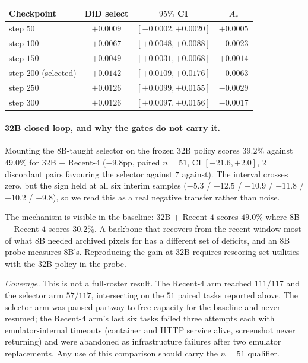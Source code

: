 \documentclass[letterpaper]{article} %
\begin{document}
\begin{center}
\centering
{\small
\setlength{\tabcolsep}{4.2pt}
\begin{tabular}{@{}lccc@{}}
\toprule
Checkpoint & DiD select & $95\%$ CI & $A_r$ \\
\midrule
step $50$ & $+0.0009$ & $[-0.0002,+0.0020]$ & $+0.0005$ \\
step $100$ & $+0.0067$ & $[+0.0048,+0.0088]$ & $-0.0023$ \\
step $150$ & $+0.0049$ & $[+0.0031,+0.0068]$ & $+0.0014$ \\
step $200$ (selected) & $\mathbf{+0.0142}$ & $[+0.0109,+0.0176]$ & $-0.0063$ \\
step $250$ & $+0.0126$ & $[+0.0099,+0.0155]$ & $-0.0029$ \\
step $300$ & $+0.0126$ & $[+0.0097,+0.0156]$ & $-0.0017$ \\
\bottomrule
\end{tabular}
}
\label{tab:s-32b-gates}
\end{center}

\paragraph{32B closed loop, and why the gates do not carry it.}
Mounting the 8B-taught selector on the frozen 32B policy scores $39.2\%$
against $49.0\%$ for 32B $+$ Recent-$4$ ($-9.8$pp, paired $n{=}51$, CI
$[-21.6,+2.0]$, $2$ discordant pairs favouring the selector against
$7$ against). The interval crosses zero, but the sign held at all six
interim samples ($-5.3$ / $-12.5$ / $-10.9$ / $-11.8$ / $-10.2$ /
$-9.8$), so we read this as a real negative transfer rather than noise.

The mechanism is visible in the baseline: 32B $+$ Recent-$4$ scores
$49.0\%$ where 8B $+$ Recent-$4$ scores $30.2\%$. A backbone that
recovers from the recent window most of what 8B needed archived pixels
for has a different set of deficits, and an 8B probe measures 8B's.
Reproducing the gain at 32B requires rescoring set utilities with the
32B policy in the probe.

\emph{Coverage.} This is not a full-roster result. The Recent-$4$ arm
reached $111/117$ and the selector arm $57/117$, intersecting on the
$51$ paired tasks reported above. The selector arm was paused partway to
free capacity for the baseline and never resumed; the Recent-$4$ arm's
last six tasks failed three attempts each with emulator-internal
timeouts (container and HTTP service alive, screenshot never returning)
and were abandoned as infrastructure failures after two emulator
replacements. Any use of this comparison should carry the $n{=}51$
qualifier.
\end{document}
